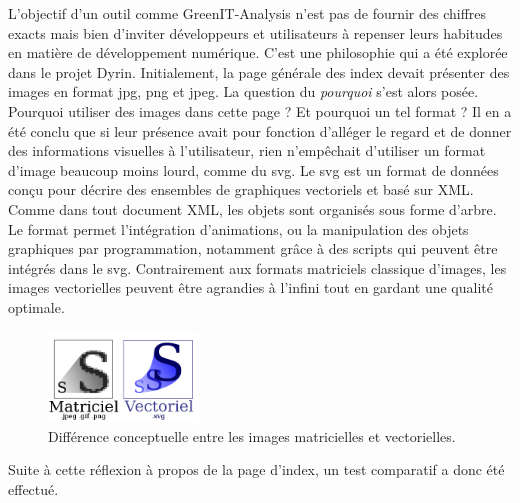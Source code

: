 \documentclass[a4paper,12pt,twoside]{book}
\begin{document}
L'objectif d'un outil comme GreenIT-Analysis n'est pas de fournir des chiffres exacts mais bien d'inviter développeurs et utilisateurs à repenser leurs habitudes en matière de développement numérique. C'est une philosophie qui a été explorée dans le projet Dyrin. Initialement, la page générale des index devait présenter des images en format jpg, png et jpeg. La question du \textit{pourquoi} s'est alors posée. Pourquoi utiliser des images dans cette page ? Et pourquoi un tel format ? Il en a été conclu que si leur présence avait pour fonction d'alléger le regard et de donner des informations visuelles à l'utilisateur, rien n'empêchait d'utiliser un format d'image beaucoup moins lourd, comme du \acrshort{svg}. Le \acrfull{svg} est un format de données conçu pour décrire des ensembles de graphiques vectoriels et basé sur XML. Comme dans tout document XML, les objets sont organisés sous forme d'arbre. Le format permet l'intégration d'animations, ou la manipulation des objets graphiques par programmation, notamment grâce à des scripts qui peuvent être intégrés dans le svg. Contrairement aux formats matriciels classique d'images, les images vectorielles peuvent être agrandies à l'infini tout en gardant une qualité optimale. 

\begin{figure}[H]
    \centering
    \includegraphics[width=4cm]{img/partie_3/svg.png}
    \caption{Différence conceptuelle entre les images matricielles et vectorielles.}
\end{figure}

Suite à cette réflexion à propos de la page d'index, un test comparatif a donc été effectué.
\end{document}
